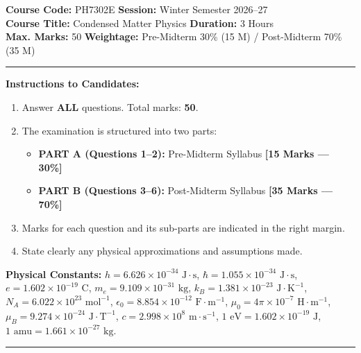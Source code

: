\documentclass[11pt,a4paper]{article}
\begin{document}
\noindent
\textbf{Course Code:} PH7302E \hfill \textbf{Session:} Winter Semester 2026--27 \\
\textbf{Course Title:} Condensed Matter Physics \hfill \textbf{Duration:} 3 Hours \\
\textbf{Max. Marks:} 50 \hfill \textbf{Weightage:} Pre-Midterm 30\% (15 M) / Post-Midterm 70\% (35 M)
\rule{\textwidth}{0.5pt}

\noindent\textbf{Instructions to Candidates:}
\begin{enumerate}[topsep=1pt,itemsep=0.5pt,parsep=0pt,leftmargin=1.4em]
    \item Answer \textbf{ALL} questions. Total marks: \textbf{50}.
    \item The examination is structured into two parts:
    \begin{itemize}[leftmargin=1.4em,itemsep=0pt]
        \item \textbf{PART A (Questions 1--2):} Pre-Midterm Syllabus \hfill \textbf{[15 Marks --- 30\%]}
        \item \textbf{PART B (Questions 3--6):} Post-Midterm Syllabus \hfill \textbf{[35 Marks --- 70\%]}
    \end{itemize}
    \item Marks for each question and its sub-parts are indicated in the right margin.
    \item State clearly any physical approximations and assumptions made.
\end{enumerate}

\vspace{2pt}
\noindent\textbf{Physical Constants:}
$h = 6.626 \times 10^{-34}\text{ J}\cdot\text{s}$, $\hbar = 1.055 \times 10^{-34}\text{ J}\cdot\text{s}$, $e = 1.602 \times 10^{-19}\text{ C}$, $m_e = 9.109 \times 10^{-31}\text{ kg}$, $k_B = 1.381 \times 10^{-23}\text{ J}\cdot\text{K}^{-1}$, $N_A = 6.022 \times 10^{23}\text{ mol}^{-1}$, $\epsilon_0 = 8.854 \times 10^{-12}\text{ F}\cdot\text{m}^{-1}$, $\mu_0 = 4\pi \times 10^{-7}\text{ H}\cdot\text{m}^{-1}$, $\mu_B = 9.274 \times 10^{-24}\text{ J}\cdot\text{T}^{-1}$, $c = 2.998 \times 10^8\text{ m}\cdot\text{s}^{-1}$, $1\text{ eV} = 1.602 \times 10^{-19}\text{ J}$, $1\text{ amu} = 1.661 \times 10^{-27}\text{ kg}$.
\vspace{2pt}
\rule{\textwidth}{0.5pt}
\end{document}
